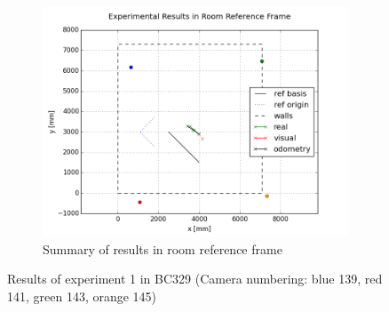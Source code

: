 \begin{figure}[H]
\begin{subfigure}{0.6\linewidth}
        \includegraphics[width=\linewidth]{files/res1_room.png}
        \caption{Summary of results in room reference frame}
    \end{subfigure}
    \caption{Results of experiment 1 in BC329 (Camera numbering: blue 139, red 141, green 143, orange 145)}
    \label{fig:experiment1}
\end{figure}

